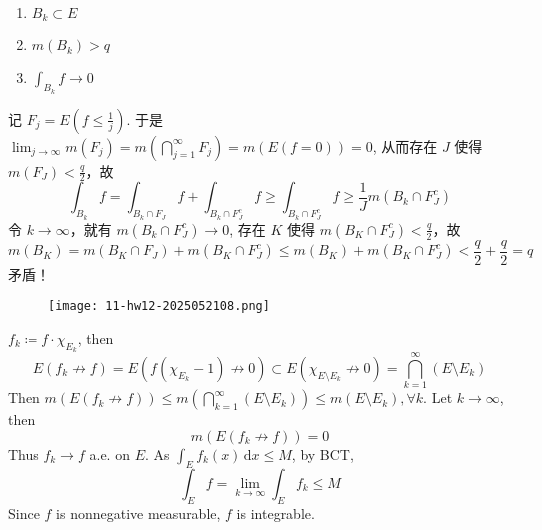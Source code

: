 \begin{enumerate}
	\item $B_k\subset E$
	\item $m(B_k)>q$
	\item $\int_{B_k}f\to0$
\end{enumerate}

记 $F_j=E\left( f\leq \frac{1}{j} \right)$. 于是 $\lim_{ j \to \infty }m(F_j)=m\left( \bigcap_{j=1}^{\infty}F_j \right)=m(E(f=0))=0$, 从而存在 $J$ 使得 $m(F_J)<\frac{q}{2}$，故
\[
\int_{B_k}f=\int_{B_k\cap F_{J}}f+\int_{B_k\cap F_{J}^{c}}f\geq \int_{B_k\cap F_{J}^{c}}f\geq \frac{1}{J}m(B_k\cap F_{J}^{c})
\]
令 $k\to \infty$，就有 $m(B_k\cap F_{J}^{c})\to0$, 存在 $K$ 使得 $m(B_{K}\cap F_{J}^{c})<\frac{q}{2}$，故
\[
m(B_{K})=m(B_{K}\cap F_{J})+m(B_{K}\cap F_{J}^{c})\leq m(B_{K})+m(B_{K}\cap F_{J}^{c})<\frac{q}{2}+\frac{q}{2}=q
\]
矛盾！

\begin{exercise}
\begin{figure}[H]
\centering
\texttt{[image: 11-hw12-2025052108.png]}
\label{}
\end{figure}
\end{exercise}
$f_k\coloneqq f\cdot\chi_{E_k}$, then
\[
E(f_k \not\to f)=E(f(\chi_{E_k}-1)\not\to0)\subset E(\chi_{E\setminus E_k}\not\to0)=\bigcap_{k=1}^{\infty} (E\setminus E_k)
\]
Then $m(E(f_k\not\to f))\leq m\left( \bigcap_{k=1}^{\infty}(E\setminus E_k) \right)\leq m(E\setminus E_k),\forall k$. Let $k\to \infty$, then
\[
m(E(f_k\not\to f))=0
\]
Thus $f_k\to f$ a.e. on $E$. As $\int_{E}^{} f_k(x) \, \mathrm{d}x\leq M$, by BCT,
\[
\int_{E}f=\lim_{ k \to \infty } \int_{E}f_k\leq M
\]
Since $f$ is nonnegative measurable, $f$ is integrable.
